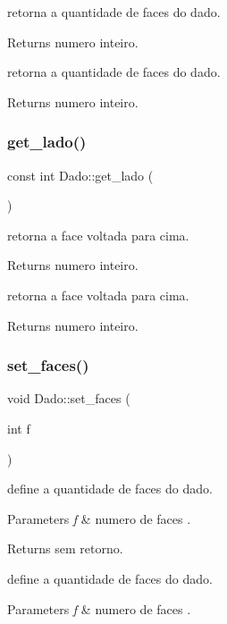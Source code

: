 retorna a quantidade de faces do dado. 

\begin{DoxyReturn}{Returns}
numero inteiro.
\end{DoxyReturn}
retorna a quantidade de faces do dado. \begin{DoxyReturn}{Returns}
numero inteiro. 
\end{DoxyReturn}
\mbox{\label{class_dado_ad1ecca7a73cc4a2b6d890eb276eeee5f}} 
\subsubsection{\texorpdfstring{get\+\_\+lado()}{get\_lado()}}
{\footnotesize\ttfamily const int Dado\+::get\+\_\+lado (\begin{DoxyParamCaption}{ }\end{DoxyParamCaption})}



retorna a face voltada para cima. 

\begin{DoxyReturn}{Returns}
numero inteiro.
\end{DoxyReturn}
retorna a face voltada para cima. \begin{DoxyReturn}{Returns}
numero inteiro. 
\end{DoxyReturn}
\mbox{\label{class_dado_a4ee9814bfa3a645b86e8a865c41acc03}} 
\subsubsection{\texorpdfstring{set\+\_\+faces()}{set\_faces()}}
{\footnotesize\ttfamily void Dado\+::set\+\_\+faces (\begin{DoxyParamCaption}\item[{int}]{f }\end{DoxyParamCaption})}



define a quantidade de faces do dado. 


\begin{DoxyParams}{Parameters}
{\em f} & numero de faces . \\
\hline
\end{DoxyParams}
\begin{DoxyReturn}{Returns}
sem retorno.
\end{DoxyReturn}
define a quantidade de faces do dado. 
\begin{DoxyParams}{Parameters}
{\em f} & numero de faces . \\
\hline
\end{DoxyParams}
\mbox{\label{class_dado_adf8e12bedf33b93809e0c990ab6face4}} 
